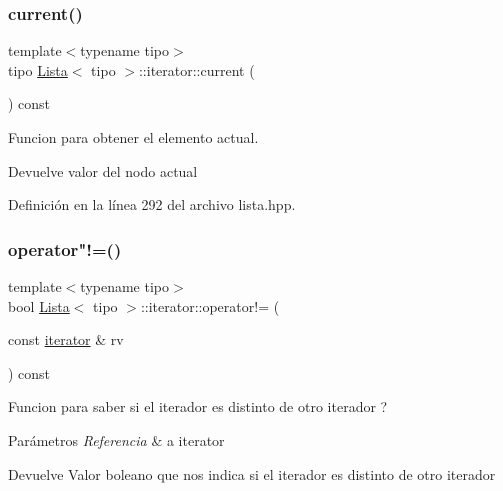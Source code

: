 \subsubsection{\texorpdfstring{current()}{current()}}
{\footnotesize\ttfamily template$<$typename tipo$>$ \\
tipo \hyperlink{classLista}{Lista}$<$ tipo $>$\+::iterator\+::current (\begin{DoxyParamCaption}{ }\end{DoxyParamCaption}) const\hspace{0.3cm}{\ttfamily [inline]}}



Funcion para obtener el elemento actual. 

\begin{DoxyReturn}{Devuelve}
valor del nodo actual 
\end{DoxyReturn}


Definición en la línea 292 del archivo lista.\+hpp.

\mbox{\label{classLista_1_1iterator_a25cd74ab23dd46dd3e9f0769c0264eb9}} 
\subsubsection{\texorpdfstring{operator"!=()}{operator!=()}}
{\footnotesize\ttfamily template$<$typename tipo$>$ \\
bool \hyperlink{classLista}{Lista}$<$ tipo $>$\+::iterator\+::operator!= (\begin{DoxyParamCaption}\item[{const \hyperlink{classLista_1_1iterator}{iterator} \&}]{rv }\end{DoxyParamCaption}) const\hspace{0.3cm}{\ttfamily [inline]}}



Funcion para saber si el iterador es distinto de otro iterador ? 


\begin{DoxyParams}{Parámetros}
{\em Referencia} & a iterator \\
\hline
\end{DoxyParams}
\begin{DoxyReturn}{Devuelve}
Valor boleano que nos indica si el iterador es distinto de otro iterador 
\end{DoxyReturn}


